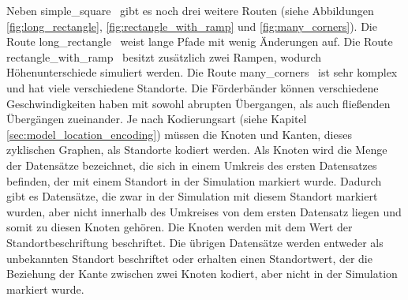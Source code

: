 \newpage
Neben \glqq simple\_square \grqq\ gibt es noch drei weitere Routen (siehe Abbildungen \ref{fig:long_rectangle}, \ref{fig:rectangle_with_ramp} und \ref{fig:many_corners}).
Die Route \glqq long\_rectangle \grqq\ weist lange Pfade mit wenig Änderungen auf.
Die Route \glqq rectangle\_with\_ramp \grqq\ besitzt zusätzlich zwei Rampen, wodurch Höhenunterschiede simuliert werden.
Die Route \glqq many\_corners \grqq\ ist sehr komplex und hat viele verschiedene Standorte.
Die Förderbänder können verschiedene Geschwindigkeiten haben mit sowohl abrupten Übergangen, als auch fließenden Übergängen zueinander.
\newline
\newline
Je nach Kodierungsart (siehe Kapitel \ref{sec:model_location_encoding}) müssen die Knoten und Kanten, dieses zyklischen Graphen, als Standorte kodiert werden.
Als Knoten wird die Menge der Datensätze bezeichnet, die sich in einem Umkreis des ersten Datensatzes befinden, der mit einem Standort in der Simulation markiert wurde.
Dadurch gibt es Datensätze, die zwar in der Simulation mit diesem Standort markiert wurden, aber nicht innerhalb des Umkreises von dem ersten Datensatz liegen
und somit zu diesen Knoten gehören.
Die Knoten werden mit dem Wert der Standortbeschriftung beschriftet.
Die übrigen Datensätze werden entweder als unbekannten Standort beschriftet oder erhalten einen Standortwert, der die Beziehung der Kante zwischen zwei Knoten kodiert,
aber nicht in der Simulation markiert wurde.